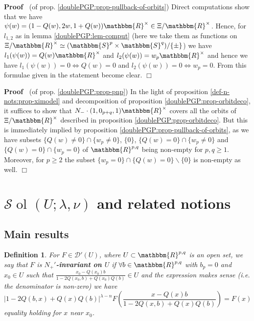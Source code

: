 \documentclass{article}
\newcommand{\tmop}[1]{\ensuremath{\operatorname{#1}}}
\newcommand{\tmtextbf}[1]{{\bfseries{#1}}}
\newenvironment{proof}{\noindent\textbf{Proof\ }}{\hspace*{\fill}$\Box$\medskip}
\newtheorem{definition}{Definition}
\numberwithin{definition}{section}
\numberwithin{lemma}{section}
\numberwithin{proposition}{section}
{\theorembodyfont{\rmfamily}\newtheorem{remark}{Remark}
\numberwithin{remark}{section}
}
\newcommand{\D}{\mathcal{D}} \newcommand{\supp}{supp}
\begin{document}
\begin{proof}
  (of prop. \ref{doublePGP:prop-pullback-of-orbits}) Direct computations show
  that we have $\psi ( w) = ( 1 - Q ( w), 2 w, 1 + Q ( w))
  \mathbbm{R}^{\times} \in \Xi /\mathbbm{R}^{\times}$. Hence, for $l_{1, 2}$
  as in lemma \ref{doublePGP:lem-comput} (here we take them as functions on
  $\Xi /\mathbbm{R}^{\times} \simeq ( \mathbbm{S}^p \times \mathbbm{S}^q) / \{
  \pm \}$) we have $l_1 ( \psi ( w)) = Q ( w) \mathbbm{R}^{\times}$ and $l_2 (
  \psi ( w)) = w_p \mathbbm{R}^{\times}$ and hence we have $l_1 ( \psi ( w)) =
  0 \Leftrightarrow Q ( w) = 0$ and $l_2 ( \psi ( w)) = 0 \Leftrightarrow w_p
  = 0$. From this formulae given in the statement become clear.
\end{proof}

\begin{proof}
  (of prop. \ref{doublePGP:prop-pnp}) In the light of proposition
  \ref{def-n-nots:prop-ximodel} and decomposition of proposition
  \ref{doublePGP:prop-orbitdeco}, it suffices to show that $N_- \cdot ( 1,
  0_{p + q}, 1) \mathbbm{R}^{\times}$ covers all the orbits of $\Xi
  /\mathbbm{R}^{\times}$ described in proposition
  \ref{doublePGP:prop-orbitdeco}. But this is immediately implied by
  proposition \ref{doublePGP:prop-pullback-of-orbits}, as we have subsets $\{
  Q ( w) \neq 0 \} \cap \{ w_p \neq 0 \}$, $\{ 0 \}$, $\{ Q ( w) = 0 \} \cap
  \{ w_p \neq 0 \}$ and $\{ Q ( w) = 0 \} \cap \{ w_p = 0 \}$ of
  $\mathbbm{R}^{p, q}$ being non-empty for $p, q \geqslant 1$. Moreover, for
  $p \geqslant 2$ the subset $\{ w_p = 0 \} \cap \{ Q ( w) = 0 \} \backslash
  \{ 0 \}$ is non-empty as well.
\end{proof}

\section{$\mathcal{S} \tmop{ol}_{} ( U ; \lambda, \nu)$ and related
notions}\label{sec:sol}

\subsection{Main results}

\begin{definition}
  \label{def-n-nots:def-n+invar}For $F \in \D' (U)$, where $U \subset
  \mathbbm{R}^{p, q}$ is an open set, we say that $F$ is
  \tmtextbf{$N_+'$-invariant on $U$} if $\forall b \in \mathbbm{R}^{p, q}$
  with $b_p = 0$ and $x_0 \in U$ such that $\frac{x_0 - Q (x_0) b}{1 - 2 Q
  (x_0, b) + Q (x_0) Q (b)} \in U$ and the expression makes sense (i.e. the
  denominator is non-zero) we have
  \begin{equation}
    \label{eq-Nequiv} | 1 - 2 Q (b, x) + Q (x) Q (b) |^{\lambda - n} F \left(
    \frac{x - Q (x) b}{1 - 2 Q (x, b) + Q (x) Q (b)} \right) = F (x)
  \end{equation}
  equality holding for $x$ near $x_0$.
\end{definition}
\end{document}
